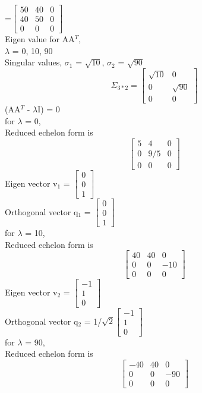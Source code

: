 \documentclass[12pt]{article}
\begin{document}
\begin{enumerate}[label=\alph*)]
=$\begin{bmatrix} 50 & 40 & 0\\40 & 50 & 0\\0 & 0 & 0\end{bmatrix}$\\
Eigen value for AA$^T$,\\
$\lambda$ = 0, 10, 90\\
Singular values, $\sigma_{1}$ = $\sqrt{10}$, $\sigma_{2}$ = $\sqrt{90}$
\[
\Sigma_{3*2} = \begin{bmatrix}  \sqrt{10} & 0\\0 & \sqrt{90}\\0 & 0\end{bmatrix}
\]
(AA$^T$ - $\lambda$I) = 0\\
for $\lambda$ = 0,\\
Reduced echelon form is
\[
\begin{bmatrix} 5 & 4 & 0\\0 & 9/5 & 0\\0 & 0 & 0\end{bmatrix}
\]
Eigen vector v$_{1}$ = $\begin{bmatrix} 0\\0\\1\end{bmatrix}$\\
Orthogonal vector q$_{1}$ = $\begin{bmatrix} 0\\0\\1\end{bmatrix}$\\
for $\lambda$ = 10,\\
Reduced echelon form is
\[
\begin{bmatrix} 40 & 40 & 0\\0 & 0 & -10\\0 & 0 & 0\end{bmatrix}
\]
Eigen vector v$_{2}$ = $\begin{bmatrix} -1\\1\\0\end{bmatrix}$\\
Orthogonal vector q$_{2}$ = 1/$\sqrt{2}$$\begin{bmatrix} -1\\1\\0\end{bmatrix}$\\
for $\lambda$ = 90,\\
Reduced echelon form is
\[
\begin{bmatrix} -40 & 40 & 0\\0 & 0 & -90\\0 & 0 & 0\end{bmatrix}
\]$$
\end{enumerate}
\end{document}

